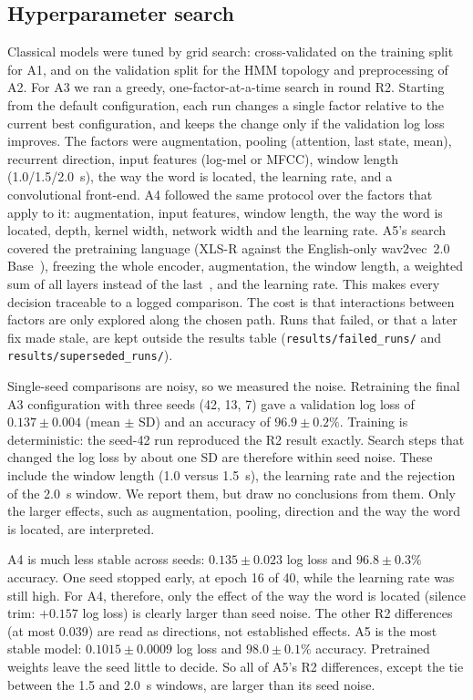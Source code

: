 \subsection{Hyperparameter search}
Classical models were tuned by grid search: cross-validated on the training split for A1, and on the validation
split for the HMM topology and preprocessing of A2. For A3 we ran a greedy, one-factor-at-a-time search in round R2.
Starting from the default configuration, each run changes a single factor relative to the current best
configuration, and keeps the change only if the validation log loss improves. The factors were augmentation,
pooling (attention, last state, mean), recurrent direction, input features (log-mel or MFCC), window length
(1.0/1.5/2.0~s), the way the word is located, the learning rate, and a convolutional front-end. A4 followed the
same protocol over the factors that apply to it: augmentation, input features, window length, the way the word is
located, depth, kernel width, network width and the learning rate. A5's search covered the pretraining language
(XLS-R against the English-only wav2vec~2.0 Base~\cite{baevski2020wav2vec}), freezing the whole encoder,
augmentation, the window length, a weighted sum of all layers instead of the last~\cite{yang2021superb}, and the
learning rate. This makes every decision traceable to a logged comparison. The cost is that interactions between factors are only explored along the chosen path. Runs that
failed, or that a later fix made stale, are kept outside the results table (\texttt{results/failed\_runs/} and
\texttt{results/superseded\_runs/}).

Single-seed comparisons are noisy, so we measured the noise. Retraining the final A3 configuration with three seeds
(42, 13, 7) gave a validation log loss of $0.137\pm0.004$ (mean $\pm$ SD) and an accuracy of $96.9\pm0.2\%$.
Training is deterministic: the seed-42 run reproduced the R2 result exactly. Search steps that changed the log loss
by about one SD are therefore within seed noise. These include the window length (1.0 versus 1.5~s), the learning
rate and the rejection of the 2.0~s window. We report them, but draw no conclusions from them. Only the larger
effects, such as augmentation, pooling, direction and the way the word is located, are interpreted.

A4 is much less stable across seeds: $0.135\pm0.023$ log loss and $96.8\pm0.3\%$ accuracy. One seed stopped
early, at epoch 16 of 40, while the learning rate was still high. For A4, therefore, only the effect of the way the
word is located (silence trim: $+0.157$ log loss) is clearly larger than seed noise. The other R2 differences
(at most 0.039) are read as directions, not established effects. A5 is the most stable model: $0.1015\pm0.0009$ log
loss and $98.0\pm0.1\%$ accuracy. Pretrained weights leave the seed little to decide. So all of A5's R2 differences,
except the tie between the 1.5 and 2.0~s windows, are larger than its seed noise.

